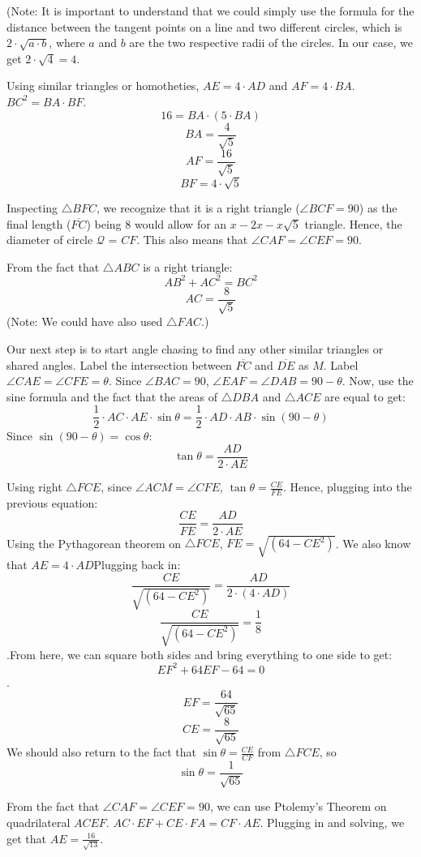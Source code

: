 \begin{enumerate}
 (Note: It is important to understand that we could simply use the formula for the distance between the tangent points on a line and two different circles, which is $2\cdot \sqrt{a\cdot b}$, where $a$ and $b$ are the two respective radii of the circles. In our case, we get $2\cdot \sqrt{4} = 4$.

 Using similar triangles or homotheties, $AE=4\cdot AD$ and $AF=4\cdot BA$. $BC^2 = BA\cdot BF$. 
 \[16 = BA\cdot (5\cdot BA)\] 
 \[BA = \frac{4}{\sqrt{5}}\] 
 \[AF = \frac{16}{\sqrt{5}}\] 
 \[BF = 4\cdot \sqrt{5}\]

 Inspecting $\triangle{BFC}$, we recognize that it is a right triangle ($\angle{BCF} = 90$) as the final length ($\overline{FC}$) being 8 would allow for an $x-2x-x\sqrt{5}$ triangle. Hence, the diameter of circle $\mathcal{Q}$ = $CF$. This also means that $\angle{CAF} = \angle{CEF} = 90$.

 From the fact that $\triangle{ABC}$ is a right triangle: 
 \[AB^2 + AC^2 = BC^2\] 
 \[AC = \frac{8}{\sqrt{5}}\](Note: We could have also  used $\triangle{FAC}$.)

 Our next step is to start angle chasing to find any other similar triangles or shared angles. Label the intersection between $\overline{FC}$ and $\overline{DE}$ as $M$. Label $\angle{CAE} = \angle{CFE} = \theta$. Since $\angle{BAC} = 90$, $\angle{EAF} = \angle{DAB} = 90-\theta$. Now, use the sine formula and the fact that the areas of $\triangle{DBA}$ and $\triangle{ACE}$ are equal to get:
 \[\frac{1}{2}\cdot AC\cdot AE\cdot \sin{\theta} = \frac{1}{2}\cdot AD\cdot AB\cdot \sin{(90-\theta)}\]Since $\sin{(90-\theta)} = \cos{\theta}$:
 \[\tan{\theta} = \frac{AD}{2\cdot AE}\]

 Using right $\triangle{FCE}$, since $\angle{ACM} = \angle{CFE}$, $\tan{\theta} = \frac{CE}{FE}$. Hence, plugging into the previous equation:
 \[\frac{CE}{FE} = \frac{AD}{2\cdot AE}\]Using the Pythagorean theorem on $\triangle{FCE}$, $FE = \sqrt{(64 - CE^2)}$. We also know that $AE=4\cdot AD$Plugging back in:
 \[\frac{CE}{\sqrt{(64 - CE^2)}} = \frac{AD}{2\cdot (4\cdot AD)}\]
 \[\frac{CE}{\sqrt{(64 - CE^2)}} = \frac{1}{8}\].From here, we can square both sides and bring everything to one side to get:
 \[EF^2 + 64EF - 64 = 0\].
 \[EF = \frac{64}{\sqrt{65}}\]
 \[CE = \frac{8}{\sqrt{65}}\]We should also return to the fact that $\sin{\theta} = \frac{CE}{CF}$ from $\triangle{FCE}$, so 
 \[\sin{\theta} = \frac{1}{\sqrt{65}}\]

 From the fact that $\angle{CAF} = \angle{CEF} = 90$, we can use Ptolemy's Theorem on quadrilateral $ACEF$. $AC\cdot EF + CE\cdot FA = CF\cdot AE$. Plugging in and solving, we get that $AE = \frac{16}{\sqrt{13}}$.


\end{enumerate}
